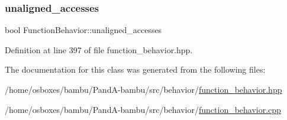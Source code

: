 \subsubsection{\texorpdfstring{unaligned\+\_\+accesses}{unaligned\_accesses}}
{\footnotesize\ttfamily bool Function\+Behavior\+::unaligned\+\_\+accesses\hspace{0.3cm}{\ttfamily [private]}}



Definition at line 397 of file function\+\_\+behavior.\+hpp.



The documentation for this class was generated from the following files\+:\begin{DoxyCompactItemize}
\item 
/home/osboxes/bambu/\+Pand\+A-\/bambu/src/behavior/\hyperlink{function__behavior_8hpp}{function\+\_\+behavior.\+hpp}\item 
/home/osboxes/bambu/\+Pand\+A-\/bambu/src/behavior/\hyperlink{function__behavior_8cpp}{function\+\_\+behavior.\+cpp}\end{DoxyCompactItemize}
